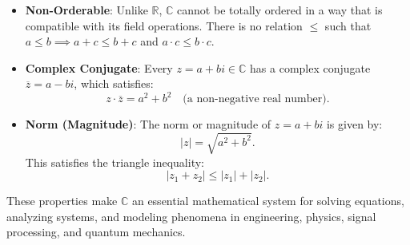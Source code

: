 \begin{itemize}
    \item \textbf{Non-Orderable}: Unlike \( \mathbb{R} \), \( \mathbb{C} \) cannot be totally ordered in a way that is compatible with its field operations. There is no relation \( \leq \) such that \( a \leq b \implies a + c \leq b + c \) and \( a \cdot c \leq b \cdot c \).

\vspace{\baselineskip}\par
    \item \textbf{Complex Conjugate}: Every \( z = a + bi \in \mathbb{C} \) has a complex conjugate \( \overline{z} = a - bi \), which satisfies:
    \[
    z \cdot \overline{z} = a^2 + b^2 \quad \text{(a non-negative real number)}.
    \]

    \item \textbf{Norm (Magnitude)}: The norm or magnitude of \( z = a + bi \) is given by:
    \[
    |z| = \sqrt{a^2 + b^2}.
    \]
    This satisfies the triangle inequality:
    \[
    |z_1 + z_2| \leq |z_1| + |z_2|.
    \]
\end{itemize}


These properties make \( \mathbb{C} \) an essential mathematical system for solving equations, analyzing systems, and modeling phenomena in engineering, physics, signal processing, and quantum mechanics.


